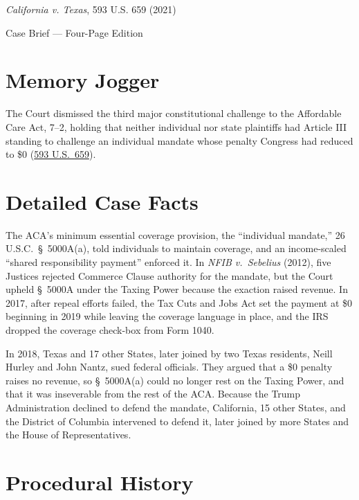 \documentclass[12pt]{article}
\begin{document}
\begin{center}
{\LARGE \textit{California v. Texas}, 593 U.S. 659 (2021)\par}
\vspace{0.8em}
{\large Case Brief --- Four-Page Edition\par}
\end{center}
\vspace{1em}

\section{Memory Jogger}

The Court dismissed the third major constitutional challenge to the Affordable Care Act, 7--2, holding that neither individual nor state plaintiffs had Article III standing to challenge an individual mandate whose penalty Congress had reduced to \$0 (\href{https://www.courtlistener.com/opinion/4892571/california-v-texas/}{593 U.S.\ 659}).

\section{Detailed Case Facts}

The ACA's minimum essential coverage provision, the ``individual mandate,'' 26 U.S.C.\ \S\ 5000A(a), told individuals to maintain coverage, and an income-scaled ``shared responsibility payment'' enforced it. In \textit{NFIB v.\ Sebelius} (2012), five Justices rejected Commerce Clause authority for the mandate, but the Court upheld \S\ 5000A under the Taxing Power because the exaction raised revenue. In 2017, after repeal efforts failed, the Tax Cuts and Jobs Act set the payment at \$0 beginning in 2019 while leaving the coverage language in place, and the IRS dropped the coverage check-box from Form 1040.

In 2018, Texas and 17 other States, later joined by two Texas residents, Neill Hurley and John Nantz, sued federal officials. They argued that a \$0 penalty raises no revenue, so \S\ 5000A(a) could no longer rest on the Taxing Power, and that it was inseverable from the rest of the ACA. Because the Trump Administration declined to defend the mandate, California, 15 other States, and the District of Columbia intervened to defend it, later joined by more States and the House of Representatives.

\section{Procedural History}
\end{document}
